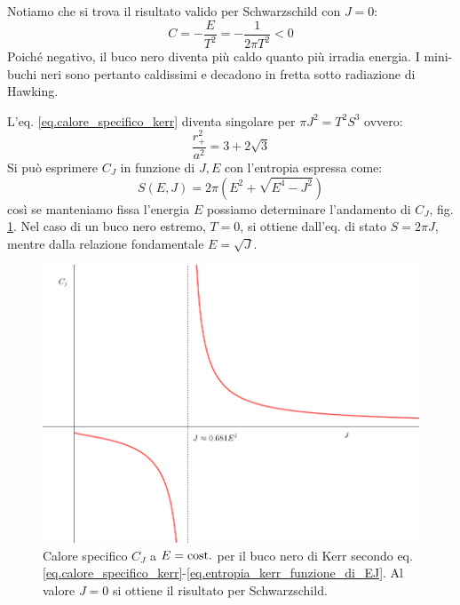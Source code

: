 Notiamo che si trova il risultato valido per Schwarzschild con $J=0$:
\begin{equation}
    C= -\frac{E}{T^2} = - \frac{1}{2\pi T^2} <0
    \label{eq.calore_specifico_schwarz}
\end{equation}
Poiché negativo, il buco nero diventa più caldo quanto più irradia energia. I mini-buchi neri sono pertanto caldissimi e decadono in fretta sotto radiazione di Hawking.

L'eq. \ref{eq.calore_specifico_kerr} diventa singolare per $\pi J^2 = T^2 S^3$ ovvero:
\begin{equation*}
    \frac{r_+^2}{a^2} = 3 + 2\sqrt{3}
\end{equation*}
Si può esprimere $C_J$ in funzione di $J, E$ con l'entropia espressa come:
\begin{equation}
    S(E,J)= 2\pi (E^2 + \sqrt{E^4 - J^2}) 
    \label{eq.entropia_kerr_funzione_di_EJ}
\end{equation}
così se manteniamo fissa l'energia $E$ possiamo determinare l'andamento di $C_J$, fig. \ref{fig.kerr_heat_capacity}.
Nel caso di un buco nero estremo, $T=0$, si ottiene dall'eq. di stato $S= 2\pi J$, mentre dalla relazione fondamentale $E= \sqrt{J}$.
\begin{figure}
    \centering
    \includegraphics[scale=0.4]{immagini/kerr_heat_capacity.png}
    \caption{Calore specifico $C_J$ a $E=\textrm{cost.}$ per il buco nero di Kerr secondo eq. \ref{eq.calore_specifico_kerr}-\ref{eq.entropia_kerr_funzione_di_EJ}. Al valore $J=0$ si ottiene il risultato per Schwarzschild.}
    \label{fig.kerr_heat_capacity}
\end{figure}

